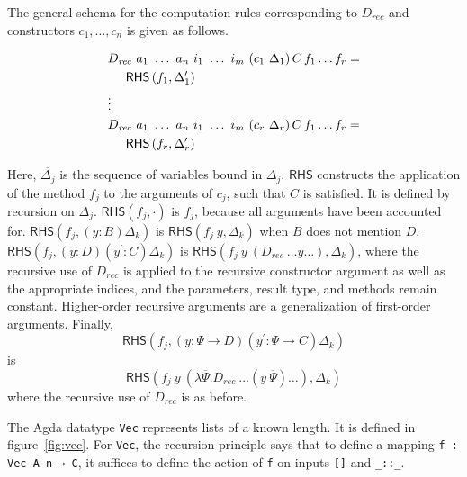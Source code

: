 \documentclass[sigplan,10pt]{acmart}
\begin{document}
The general schema for the computation rules corresponding to $D_{\mathit{rec}}$ and constructors $c_1, \ldots, c_n$ is given as follows.

\newcommand*{\RHSap}[2]{\ensuremath{\mathsf{RHS}\left(#1, #2\right)}}
\newcommand*{\RHS}[1]{\RHSap{f_{#1}}{\Delta_{#1}^\prime}}


\begin{center}
\begingroup
\fontsize{8.9pt}{2pt}\selectfont
\begin{align*}
& D_\mathit{rec}\ a_1\ \ldots\ a_n\ i_1\ \ldots\ i_m\ (c_1\ {\Delta_1}) \, C \, f_1 \ldots f_r = \\
&\hspace{0.5cm}\RHS{1}\\
& \vdots  \\
& D_\mathit{rec}\ a_1\ \ldots\ a_n\ i_1\ \ldots\ i_m\ (c_r\ {\Delta_r}) \, C \, f_1 \ldots f_r = \\
&\hspace{0.5cm}\RHS{r}\\ 
\end{align*}
\endgroup
\end{center}
\normalsize

Here, $\overline{\Delta_j}$ is the sequence of variables bound in $\Delta_j$.
$\mathsf{RHS}$ constructs the application of the method $f_j$ to the arguments of $c_j$, such that $C$ is satisfied.
It is defined by recursion on $\Delta_j$.
$\RHSap{f_j}{\cdot}$ is $f_j$, because all arguments have been accounted for.
$\RHSap{f_j}{(y : B)\Delta_k}$ is $\RHSap{f_j\ y}{\Delta_k}$ when $B$ does not mention $D$.
$\RHSap{f_j}{(y : D) (y^\prime : C)\Delta_k}$ is $\RHSap{f_j\ y\ \left(D_{\mathit{rec}}\ \ldots y \ldots\right)}{\Delta_k}$, where the recursive use of $D_{\mathit{rec}}$ is applied to the recursive constructor argument as well as the appropriate indices, and the parameters, result type, and methods remain constant.
Higher-order recursive arguments are a generalization of first-order arguments.
Finally,
\begin{displaymath}
\RHSap{f_j}{(y : \Psi \to D) (y^\prime : \Psi \to C)\Delta_k}
\end{displaymath}
is
\begin{displaymath}
\RHSap{f_j\ y\ \left(\lambda \overline{\Psi} . D_{\mathit{rec}}\ \ldots \left(y\ \overline{\Psi} \right) \ldots\right)}{\Delta_k}
\end{displaymath}
where the recursive use of $D_{\mathit{rec}}$ is as before.

The Agda datatype \texttt{Vec} represents lists of a known length. It is defined in figure~\ref{fig:vec}. For {\tt Vec}, the recursion principle says that to define a mapping {\tt f : Vec A n → C}, it suffices to define the action of {\tt f} on inputs {\tt []} and {\tt \_::\_}.
\end{document}
